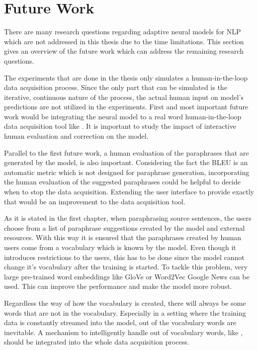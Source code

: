 \chapter{Future Work}\label{conclusion}

There are many research questions regarding adaptive neural models for NLP which are not addressed in this thesis due to the time limitations. This section gives an overview of the future work which can address the remaining research questions. 

The experiments that are done in the thesis only simulates a human-in-the-loop data acquisition process. Since the only part that can be simulated is the iterative, continuous nature of the process, the actual human input on model's predictions are not utilized in the experiments. First and most important future work would be integrating the neural model to a real word human-in-the-loop data acquisition tool like \cite{par4sim}. It is important to study the impact of interactive human evaluation and correction on the model. 

Parallel to the first future work, a human evaluation of the paraphrases that are generated by the model, is also important. Considering the fact the BLEU is an automatic metric which is not designed for paraphrase generation, incorporating the human evaluation of the suggested paraphrases could be helpful to decide when to stop the data acquisition. Extending the user interface to provide exactly that would be an improvement to the data acquisition tool.

As it is stated in the first chapter, when paraphrasing source sentences, the users choose from a list of paraphrase suggestions created by the model and external resources. With this way it is ensured that the paraphrases created by human users come from a vocabulary which is known by the model. Even though it introduces restrictions to the users, this has to be done since the model cannot change it's vocabulary after the training is started. To tackle this problem, very large pre-trained word embeddings like GloVe \cite{glove} or Word2Vec Google News \cite{mikolov} can be used. This can improve the performance and make the model more robust.

Regardless the way of how the vocabulary is created, there will always be some words that are not in the vocabulary. Especially in a setting where the training data is constantly streamed into the model, out of the vocabulary words are inevitable. A mechanism to intelligently handle out of vocabulary words, like \cite{ofw} , should be integrated into the whole data acquisition process.

